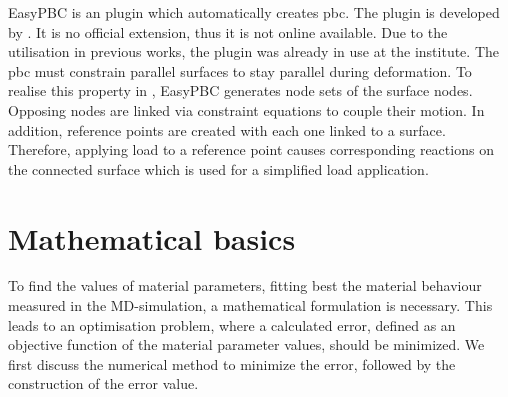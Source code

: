 EasyPBC is an  plugin which automatically creates \acrshort{pbc}. The plugin is developed by \citet{omairey_development_2019}. It is no official  extension, thus it is not online available. Due to the utilisation in previous works, the plugin was already in use at the institute. The \acrshort{pbc} must constrain parallel surfaces to stay parallel during deformation. To realise this property in , EasyPBC generates node sets of the surface nodes. Opposing nodes are linked via constraint equations to couple their motion. In addition, reference points are created with each one linked to a surface. Therefore, applying load to a reference point causes corresponding reactions on the connected surface which is used for a simplified load application. 








\section{Mathematical basics} \label{sec: mathematics}

To find the values of material parameters, fitting best the material behaviour measured in the MD-simulation, a mathematical formulation is necessary. This leads to an optimisation problem, where a calculated error, defined as an objective function of the material parameter values, should be minimized. We first discuss the numerical method to minimize the error, followed by the construction of the error value.

